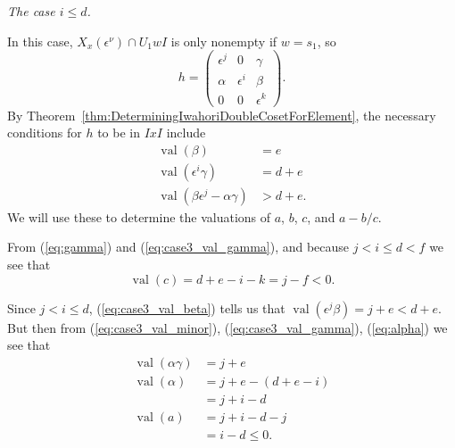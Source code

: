 \documentclass{amsart}
\theoremstyle{definition}
\def\e{\epsilon}
\def\val{\mathop{\mathrm{val}}}
\def\en{\e^{\nu}}
\def\X{X_x(\en)}
\newcommand\subsubsubsection[1]{\vspace{0.5em}\begin{paragraph}{}\noindent \normalfont\large\itshape #1. \end{paragraph}\vspace{0.5em}}
\begin{document}
  \subsubsubsection{The case $i \le d$}
  In this case, $\X \cap U_1 w I$ is only nonempty if $w = s_1$, so
  \begin{equation*}
    h = \begin{pmatrix}
      \e^j & 0 & \gamma \\
      \alpha & \e^i & \beta \\
      0 & 0 & \e^k
    \end{pmatrix}.
  \end{equation*}
  By Theorem~\ref{thm:DeterminingIwahoriDoubleCosetForElement}, the necessary
  conditions for $h$ to be in $IxI$ include
  \begin{align}
    \label{eq:case3_val_beta}
    \val(\beta) &= e \\
    \label{eq:case3_val_gamma}
    \val(\e^i\gamma) &= d + e \\
    \label{eq:case3_val_minor}
    \val(\beta\e^j - \alpha\gamma) &> d + e.
  \end{align}
  We will use these to determine the valuations of $a$, $b$, $c$, and $a -
  b/c$.

  From (\ref{eq:gamma}) and (\ref{eq:case3_val_gamma}), and because $j < i \le
  d < f$ we see that
  \begin{equation}
    \label{eq:case3_val_c}
    \val(c) = d + e - i - k = j - f < 0.
  \end{equation}

  Since $j < i \le d$, (\ref{eq:case3_val_beta}) tells us that $\val(\e^j\beta)
  = j + e < d + e$.  But then from (\ref{eq:case3_val_minor}),
  (\ref{eq:case3_val_gamma}), (\ref{eq:alpha}) we see that
  \begin{align}
    \val(\alpha\gamma) &= j + e \nonumber \\
    \val(\alpha) &= j + e - (d + e - i) \nonumber \\
                 &= j + i - d \nonumber \\
    \label{eq:case3_val_a}
    \val(a) &= j + i - d - j \nonumber \\
            &= i - d \le 0.
  \end{align}
\end{document}
